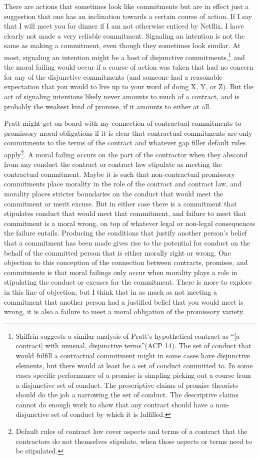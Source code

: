 There are actions that sometimes look like commitments but are in effect
just a suggestion that one has an inclination towards a certain course
of action. If I say that I will meet you for dinner if I am not
otherwise enticed by Netflix, I have clearly not made a very reliable
commitment. Signaling an intention is not the same as making a
commitment, even though they sometimes look similar. At most, signaling
an intention might be a host of disjunctive commitments,\footnote{Shiffrin
  suggests a similar analysis of Pratt's hypothetical contract as ``{[}a
  contract{]} with unusual, disjunctive terms''(ACP 14). The set of
  conduct that would fulfill a contractual commitment might in some
  cases have disjunctive elements, but there would at least be a set of
  conduct committed to. In some cases specific performance of a promise
  is simpling picking out a course from a disjunctive set of conduct.
  The prescriptive claims of promise theorists should do the job a
  narrowing the set of conduct. The descriptive claims cannot do enough
  work to show that any contract should have a non-disjunctive set of
  conduct by which it is fulfilled.} and the moral failing would occur
if a course of action was taken that had no concern for any of the
disjunctive commitments (and someone had a reasonable expectation that
you would to live up to your word of doing X, Y, or Z). But the act of
signaling intentions likely never amounts to much of a contract, and is
probably the weakest kind of promise, if it amounts to either at all.

Pratt might get on board with my connection of contractual commitments
to promissory moral obligations if it is clear that contractual
commitments are only commitments to the terms of the contract and
whatever gap filler default rules apply\footnote{Default rules of
  contract law cover aspects and terms of a contract that the
  contractors do not themselves stipulate, when those aspects or terms
  need to be stipulated.}. A moral failing occurs on the part of the
contractor when they abscond from any conduct the contract or contract
law stipulate as meeting the contractual commitment. Maybe it is such
that non-contractual promissory commitments place morality in the role
of the contract and contract law, and morality places stricter
boundaries on the conduct that would meet the commitment or merit
excuse. But in either case there is a commitment that stipulates conduct
that would meet that commitment, and failure to meet that commitment is
a moral wrong, on top of whatever legal or non-legal consequences the
failure entails. Producing the conditions that justify another person's
belief that a commitment has been made gives rise to the potential for
conduct on the behalf of the committed person that is either morally
right or wrong. One objection to this conception of the connection
between contracts, promises, and commitments is that moral failings only
occur when morality plays a role in stipulating the conduct or excuses
for the commitment. There is more to explore in this line of objection,
but I think that in as much as not meeting a commitment that another
person had a justified belief that you would meet is wrong, it is also a
failure to meet a moral obligation of the promissory variety.

